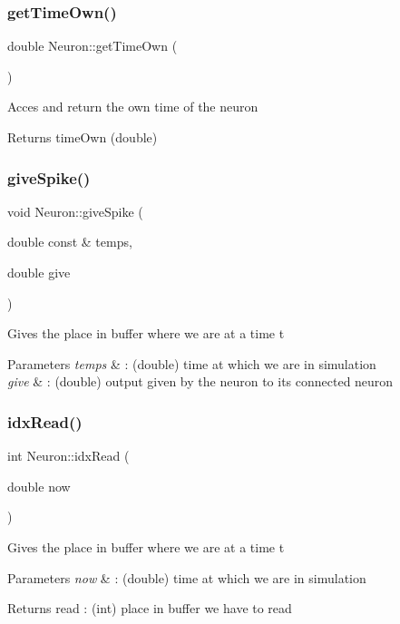 \subsubsection{\texorpdfstring{get\+Time\+Own()}{getTimeOwn()}}
{\footnotesize\ttfamily double Neuron\+::get\+Time\+Own (\begin{DoxyParamCaption}{ }\end{DoxyParamCaption})}

Acces and return the own time of the neuron \begin{DoxyReturn}{Returns}
time\+Own (double) 
\end{DoxyReturn}
\mbox{\label{class_neuron_ae45fbadb556036a0f33b2f1790ccd5d7}} 
\subsubsection{\texorpdfstring{give\+Spike()}{giveSpike()}}
{\footnotesize\ttfamily void Neuron\+::give\+Spike (\begin{DoxyParamCaption}\item[{double const \&}]{temps,  }\item[{double}]{give }\end{DoxyParamCaption})}

Gives the place in buffer where we are at a time t 
\begin{DoxyParams}{Parameters}
{\em temps} & \+: (double) time at which we are in simulation \\
\hline
{\em give} & \+: (double) output given by the neuron to its connected neuron \\
\hline
\end{DoxyParams}
\mbox{\label{class_neuron_a0276a70354f2fb046123efeec43420dc}} 
\subsubsection{\texorpdfstring{idx\+Read()}{idxRead()}}
{\footnotesize\ttfamily int Neuron\+::idx\+Read (\begin{DoxyParamCaption}\item[{double}]{now }\end{DoxyParamCaption})}

Gives the place in buffer where we are at a time t 
\begin{DoxyParams}{Parameters}
{\em now} & \+: (double) time at which we are in simulation \\
\hline
\end{DoxyParams}
\begin{DoxyReturn}{Returns}
read \+: (int) place in buffer we have to read 
\end{DoxyReturn}
\mbox{\label{class_neuron_a62d6ff8e0fb0f776dfa9bc555a994b8b}} 
